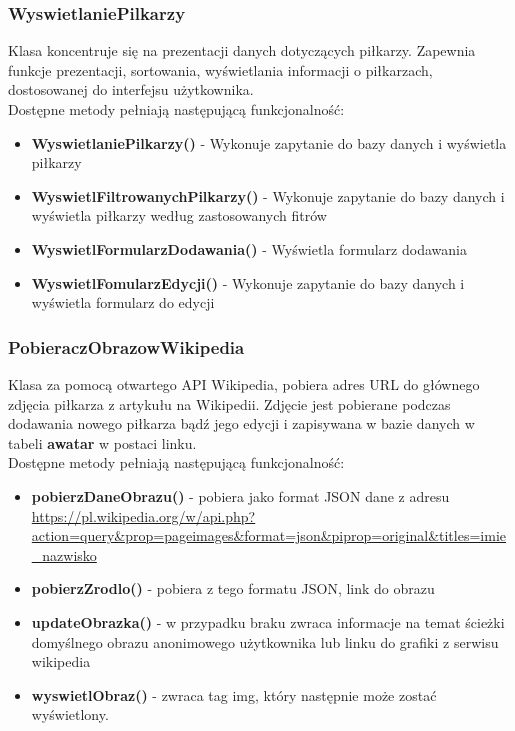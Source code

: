     \subsubsection{WyswietlaniePilkarzy}
        Klasa koncentruje się na prezentacji danych dotyczących piłkarzy. Zapewnia funkcje prezentacji, sortowania, wyświetlania informacji o piłkarzach, dostosowanej do interfejsu użytkownika.\\
        Dostępne metody pełniają następującą funkcjonalność: 
        \begin{itemize}
            \item \textbf{WyswietlaniePilkarzy()} -  Wykonuje zapytanie do bazy danych i wyświetla piłkarzy
            \item \textbf{WyswietlFiltrowanychPilkarzy()} - Wykonuje zapytanie do bazy danych i wyświetla piłkarzy według zastosowanych fitrów
            \item \textbf{WyswietlFormularzDodawania()} - Wyświetla formularz dodawania 
            \item \textbf{WyswietlFomularzEdycji()} - Wykonuje zapytanie do bazy danych i wyświetla formularz do edycji
        \end{itemize}
         



    \subsubsection{PobieraczObrazowWikipedia}
        Klasa za pomocą otwartego API Wikipedia, pobiera adres URL do głównego zdjęcia piłkarza z artykułu na Wikipedii. Zdjęcie jest pobierane podczas dodawania nowego piłkarza bądź jego edycji i zapisywana w bazie danych w tabeli \textbf{awatar} w postaci linku.\\
        Dostępne metody pełniają następującą funkcjonalność: 
        \begin{itemize}
            \item \textbf{pobierzDaneObrazu()} -  pobiera jako format JSON dane z adresu \url{https://pl.wikipedia.org/w/api.php?action=query&prop=pageimages&format=json&piprop=original&titles=imie_nazwisko}
            \item \textbf{pobierzZrodlo()} - pobiera z tego formatu JSON, link do obrazu
            \item \textbf{updateObrazka()} - w przypadku braku zwraca informacje na temat ścieżki domyślnego obrazu anonimowego użytkownika lub linku do grafiki z serwisu wikipedia
            \item \textbf{wyswietlObraz()} - zwraca tag img, który następnie może zostać wyświetlony.
        \end{itemize}
         



